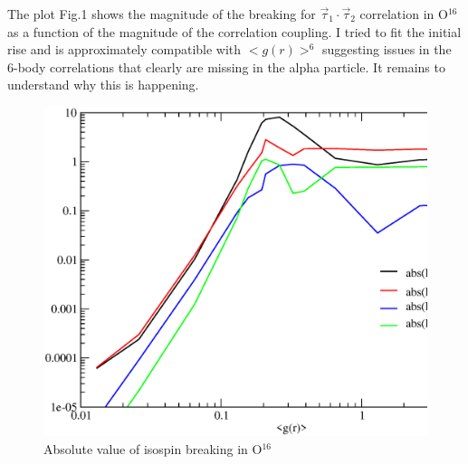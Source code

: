 \documentclass[a4paper]{article}
\begin{document}
The plot Fig.1 shows the magnitude of the breaking for $\vec{\tau}_1\cdot\vec{\tau}_2$ correlation in O$^{16}$ as a function of the magnitude of the correlation coupling. I tried to fit the initial rise and is approximately compatible with $<g(r)>^6$ suggesting issues in the 6-body correlations that clearly are missing in the alpha particle. It remains to understand why this is happening.

\begin{figure}[htb]
\includegraphics[width=1.0\columnwidth]{o16_issue.eps}
\caption{Absolute value of isospin breaking in O$^{16}$}
\label{fig:o16issue}
\end{figure}
\end{document}
